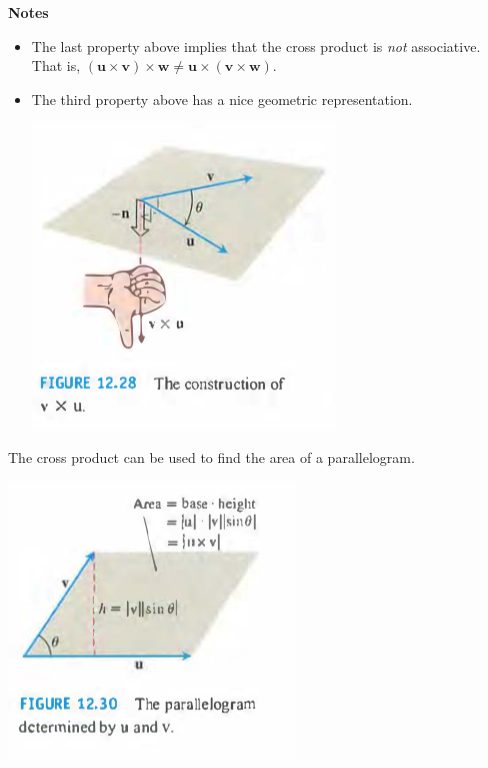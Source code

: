\documentclass[12pt, letter]{article}
\theoremstyle{plain}
\numberwithin{theorem}{section}
\theoremstyle{definition}
\begin{document}
\bigskip

\textbf{Notes}
\begin{itemize}
\item The last property above implies that the cross product is \textit{not} associative. That is, $(\bm{u} \times \bm{v}) \times \bm{w} \neq \bm{u} \times (\bm{v} \times \bm{w})$.
\item The third property above has a nice geometric representation.

\bigskip

\begin{center}
\includegraphics[scale=0.8]{m1_f11}
\end{center}

\end{itemize}

\bigskip

\hrulefill

\bigskip

The cross product can be used to find the area of a parallelogram. 

\bigskip

\begin{center}
\includegraphics[scale=0.8]{m1_f12}
\end{center}
\end{document}
